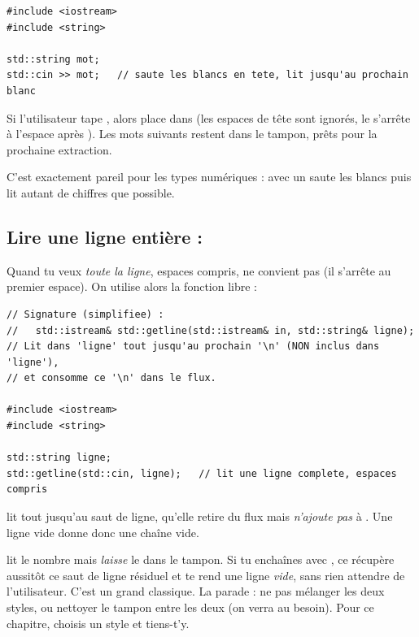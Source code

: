 \documentclass[11pt]{article}
\begin{document}
\begin{lstlisting}
#include <iostream>
#include <string>

std::string mot;
std::cin >> mot;   // saute les blancs en tete, lit jusqu'au prochain blanc
\end{lstlisting}

Si l'utilisateur tape , alors
 place  dans  (les espaces de tête
sont ignorés, le \code{>>} s'arrête à l'espace après ). Les mots
suivants restent dans le tampon, prêts pour la prochaine extraction.

C'est exactement pareil pour les types numériques :  avec
 un  saute les blancs puis lit autant de chiffres que possible.

\subsection*{Lire une ligne entière : }

Quand tu veux \emph{toute la ligne}, espaces compris, \code{>>} ne convient pas
(il s'arrête au premier espace). On utilise alors la fonction libre
 :

\begin{lstlisting}
// Signature (simplifiee) :
//   std::istream& std::getline(std::istream& in, std::string& ligne);
// Lit dans 'ligne' tout jusqu'au prochain '\n' (NON inclus dans 'ligne'),
// et consomme ce '\n' dans le flux.

#include <iostream>
#include <string>

std::string ligne;
std::getline(std::cin, ligne);   // lit une ligne complete, espaces compris
\end{lstlisting}

 lit tout jusqu'au saut de ligne, qu'elle retire du flux mais
\emph{n'ajoute pas} à . Une ligne vide donne donc une chaîne vide.

\begin{piege}
 lit le nombre mais \emph{laisse} le 
dans le tampon. Si tu enchaînes avec , ce
 récupère aussitôt ce saut de ligne résiduel et te rend une ligne
\emph{vide}, sans rien attendre de l'utilisateur. C'est un grand classique. La
parade : ne pas mélanger les deux styles, ou nettoyer le tampon entre les deux
(on verra  au besoin). Pour ce chapitre, choisis un style et
tiens-t'y.
\end{piege}
\end{document}
